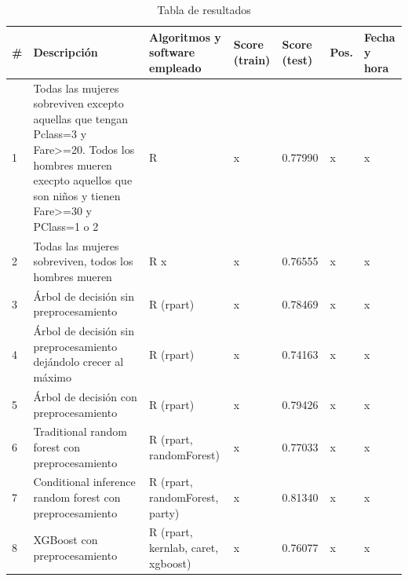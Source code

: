 \begin{table}[]
	\centering
	\caption{Tabla de resultados}
	\label{tab:results}
	\begin{tabular}{|l|p{5.1cm}p{1.8cm}p{1.2cm}p{1.2cm}p{0.6cm}p{1.5cm}|}
		\hline
		\# & Descripción & Algoritmos y software empleado & Score (train) & Score (test) & Pos. & Fecha y hora \\ \hline \hline
		1  & Todas las mujeres sobreviven excepto aquellas que tengan Pclass=3 y Fare\textgreater=20. Todos los hombres mueren execpto aquellos que son niños y tienen Fare\textgreater=30 y PClass=1 o 2 & R & x & 0.77990 & x & x \\ \hline
		2  & Todas las mujeres sobreviven, todos los hombres mueren & R x & x & 0.76555 & x & x \\ \hline
		3  & Árbol de decisión sin preprocesamiento & R (rpart) & x & 0.78469 & x & x \\ \hline
		4  & Árbol de decisión sin preprocesamiento dejándolo crecer al máximo & R (rpart) & x & 0.74163 & x & x \\ \hline
		5  & Árbol de decisión con preprocesamiento & R (rpart) & x & 0.79426 & x & x \\ \hline
		6  & Traditional random forest con preprocesamiento & R (rpart, randomForest) & x & 0.77033 & x & x \\ \hline
		7  & Conditional inference random forest con preprocesamiento & R (rpart, randomForest, party) & x & 0.81340 & x & x \\ \hline
		8  & XGBoost con preprocesamiento & R (rpart, kernlab, caret, xgboost) & x & 0.76077 & x & x \\ \hline       
	\end{tabular}
\end{table}


\newpage


